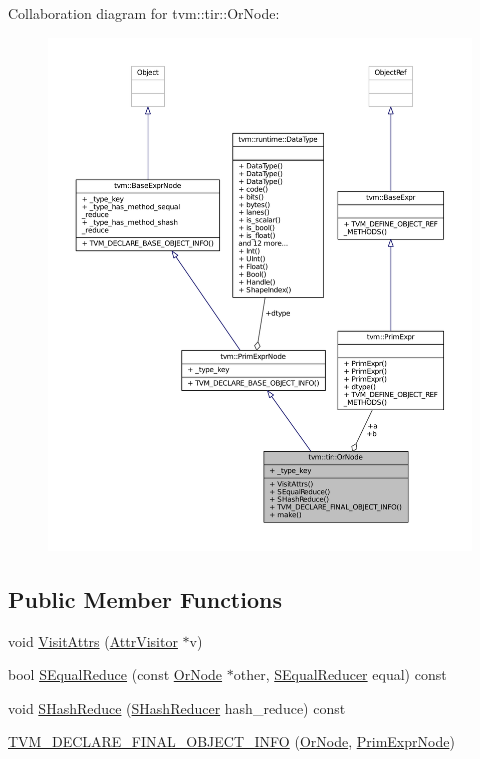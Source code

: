 Collaboration diagram for tvm\+:\+:tir\+:\+:Or\+Node\+:
\nopagebreak
\begin{figure}[H]
\begin{center}
\leavevmode
\includegraphics[width=350pt]{classtvm_1_1tir_1_1OrNode__coll__graph}
\end{center}
\end{figure}
\subsection*{Public Member Functions}
\begin{DoxyCompactItemize}
\item 
void \hyperlink{classtvm_1_1tir_1_1OrNode_adeffc3d1cdf32cefe1e7fab3a6b6f9f9}{Visit\+Attrs} (\hyperlink{classtvm_1_1AttrVisitor}{Attr\+Visitor} $\ast$v)
\item 
bool \hyperlink{classtvm_1_1tir_1_1OrNode_af21aa217c579adf7b73f2b9f1ce1dd27}{S\+Equal\+Reduce} (const \hyperlink{classtvm_1_1tir_1_1OrNode}{Or\+Node} $\ast$other, \hyperlink{classtvm_1_1SEqualReducer}{S\+Equal\+Reducer} equal) const 
\item 
void \hyperlink{classtvm_1_1tir_1_1OrNode_a0f4e04760d3ec7f808d8aa51b3607fda}{S\+Hash\+Reduce} (\hyperlink{classtvm_1_1SHashReducer}{S\+Hash\+Reducer} hash\+\_\+reduce) const 
\item 
\hyperlink{classtvm_1_1tir_1_1OrNode_a705bb9e8ad690e506b286469dbd2eb4a}{T\+V\+M\+\_\+\+D\+E\+C\+L\+A\+R\+E\+\_\+\+F\+I\+N\+A\+L\+\_\+\+O\+B\+J\+E\+C\+T\+\_\+\+I\+N\+FO} (\hyperlink{classtvm_1_1tir_1_1OrNode}{Or\+Node}, \hyperlink{classtvm_1_1PrimExprNode}{Prim\+Expr\+Node})
\end{DoxyCompactItemize}
